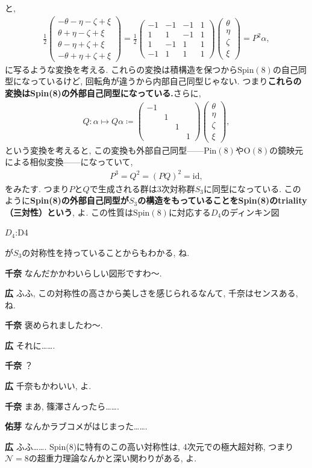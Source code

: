 \documentclass{ltjsarticle}
\theoremstyle{definition}
\newcommand{\parno}{\par\noindent}
\begin{document}
と,
\begin{align}
  \frac12
  \begin{pmatrix}
    -\theta-\eta-\zeta+\xi\\
    \theta+\eta-\zeta+\xi\\
    \theta-\eta+\zeta+\xi\\
    -\theta+\eta+\zeta+\xi
  \end{pmatrix}
  =\frac12
  \begin{pmatrix}
    -1&-1&-1&1\\
    1&1&-1&1\\
    1&-1&1&1\\
    -1&1&1&1
  \end{pmatrix}
  \begin{pmatrix}
    \theta\\
    \eta\\
    \zeta\\
    \xi
  \end{pmatrix}
  =P^2\alpha,
\end{align}
に写るような変換を考える. これらの変換は積構造を保つから$\mathrm{Spin}(8)$の自己同型になっているけど, 回転角が違うから内部自己同型じゃない. つまり\textbf{これらの変換はSpin(8)の外部自己同型になっている.}さらに,
\begin{gather}
  Q
  :\alpha\mapsto Q\alpha\coloneqq
  \begin{pmatrix}
    -1&&&\\
    &1&&\\
    &&1&\\
    &&&1
  \end{pmatrix}
  \begin{pmatrix}
    \theta\\
    \eta\\
    \zeta\\
    \xi
  \end{pmatrix},
\end{gather}
という変換を考えると, この変換も外部自己同型------$\mathrm{Pin}(8)$や$\mathrm{O}(8)$の鏡映元による相似変換------になっていて,
\begin{gather}
  P^3=Q^2=(PQ)^2=\mathrm{id},
\end{gather}
をみたす. つまり$P$と$Q$で生成される群は3次対称群$S_3$に同型になっている. このように\textbf{Spin(8)の外部自己同型が$S_3$の構造をもっていることをSpin(8)のtriality（三対性）という}, よ. この性質は$\mathrm{Spin}(8)$に対応する$D_4$のディンキン図
\begin{tcolorbox}
  \begin{center}
   $D_4$:\quad\dynkin D4
  \end{center}
\end{tcolorbox}
\parno
が$S_3$の対称性を持っていることからもわかる, ね.\parno
\textbf{千奈} なんだかかわいらしい図形ですわ〜.\parno
\textbf{広} ふふ, この対称性の高さから美しさを感じられるなんて, 千奈はセンスある, ね.\parno
\textbf{千奈} 褒められましたわ〜.\parno
\textbf{広} それに…….\parno
\textbf{千奈} ？\parno
\textbf{広} 千奈もかわいい, よ.\parno
\textbf{千奈} まあ, 篠澤さんったら…….\parno
\textbf{佑芽} なんかラブコメがはじまった…….\parno
\textbf{広} ふふ……. Spin(8)に特有のこの高い対称性は, 4次元での極大超対称, つまり$\mathcal N=8$の超重力理論なんかと深い関わりがある, よ.
\end{document}
